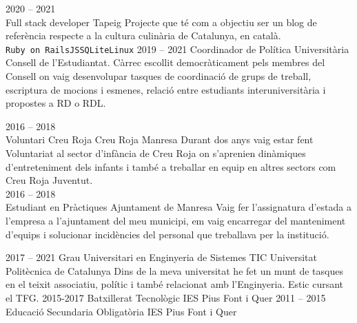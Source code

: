 \documentclass[9pt]{developercv} %
\begin{document}
\begin{entrylist}
    \entry
		{2020 -- 2021\\}
		{Full stack developer}
		{Tapeig}
		{Projecte que té com a objectiu ser un blog de referència respecte a la cultura culinària de
        Catalunya, en català.\\ \texttt{Ruby on Rails}\slashsep\texttt{JS}\slashsep\texttt{SQLite}\slashsep\texttt{Linux}}
	\entry
		{2019 -- 2021}
		{Coordinador de Política Universitària}
		{Consell de l'Estudiantat.}
		{ Càrrec escollit democràticament pels membres del Consell on vaig desenvolupar tasques de
        coordinació de grups de treball, escriptura de mocions i esmenes, relació entre estudiants
        interuniversitària i propostes a RD o RDL.
		\\ }
	
	\entry
		{2016 -- 2018\\}
		{Voluntari Creu Roja}
		{Creu Roja Manresa}
		{Durant dos anys vaig estar fent Voluntariat al sector d’infància de Creu Roja on s’aprenien
        dinàmiques d’entreteniment dels infants i també a treballar en equip en altres sectors com Creu
        Roja Juventut. \\ }
	\entry
		{2016 -- 2018\\}
		{Estudiant en Pràctiques}
		{Ajuntament de Manresa}
		{ Vaig fer l'assignatura d'estada a l'empresa a l'ajuntament del meu municipi, em vaig encarregar del manteniment d'equips i solucionar incidències del personal que treballava per la institució. }
\end{entrylist}



\begin{entrylist}
	\entry
		{2017 -- 2021}
		{Grau Universitari en Enginyeria de Sistemes TIC}
		{Universitat Politècnica de Catalunya}
		{Dins de la meva universitat he fet un munt de tasques en el teixit associatiu, polític i també
relacionat amb l’Enginyeria. Estic cursant el TFG.}
	\entry
		{2015-2017}
		{Batxillerat Tecnològic}
		{IES Pius Font i Quer}
		{}
	\entry
		{2011 -- 2015}
		{Educació Secundaria Obligatòria}
		{IES Pius Font i Quer}
		{}
\end{entrylist}

\end{document}
